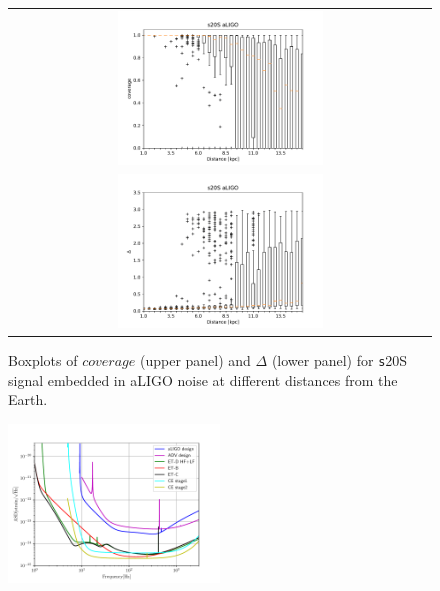 \begin{figure}
  \centering
  \begin{tabular}{c}
    \includegraphics[width=0.5\textwidth]{plots/s20--SFHo_covpbb_boxplot_aLIGO} \\
    \includegraphics[width=0.5\textwidth]{plots/s20--SFHo_error_boxplot_aLIGO} \\
  \end{tabular}
    
 \caption{Boxplots of $coverage$ (upper panel) and $\Delta$ (lower panel) for {\texttt s20S} signal embedded in aLIGO noise at different distances from the Earth.} \label{fig:s20results}
\end{figure}


\begin{figure}
 \centering
 \includegraphics[width=0.5\textwidth]{plots/spectrum}
 \caption{} \label{fig:spectrum}
\end{figure}

